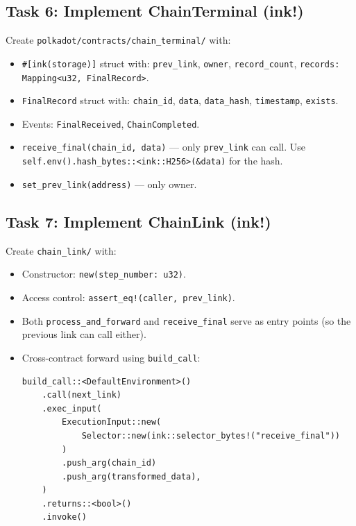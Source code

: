 \documentclass[11pt,a4paper]{article}
\begin{document}
\subsection{Task 6: Implement ChainTerminal (ink!)}

Create \texttt{polkadot/contracts/chain\_terminal/} with:

\begin{itemize}
    \item \texttt{\#[ink(storage)]} struct with: \texttt{prev\_link}, \texttt{owner},
          \texttt{record\_count}, \texttt{records: Mapping<u32, FinalRecord>}.
    \item \texttt{FinalRecord} struct with: \texttt{chain\_id}, \texttt{data},
          \texttt{data\_hash}, \texttt{timestamp}, \texttt{exists}.
    \item Events: \texttt{FinalReceived}, \texttt{ChainCompleted}.
    \item \texttt{receive\_final(chain\_id, data)} --- only \texttt{prev\_link} can call.
          Use \texttt{self.env().hash\_bytes::<ink::H256>(\&data)} for the hash.
    \item \texttt{set\_prev\_link(address)} --- only owner.
\end{itemize}

\subsection{Task 7: Implement ChainLink (ink!)}

Create \texttt{chain\_link/} with:

\begin{itemize}
    \item Constructor: \texttt{new(step\_number: u32)}.
    \item Access control: \texttt{assert\_eq!(caller, prev\_link)}.
    \item Both \texttt{process\_and\_forward} and \texttt{receive\_final} serve
          as entry points (so the previous link can call either).
    \item Cross-contract forward using \texttt{build\_call}:
\begin{lstlisting}[style=rust]
build_call::<DefaultEnvironment>()
    .call(next_link)
    .exec_input(
        ExecutionInput::new(
            Selector::new(ink::selector_bytes!("receive_final"))
        )
        .push_arg(chain_id)
        .push_arg(transformed_data),
    )
    .returns::<bool>()
    .invoke()
\end{lstlisting}
\end{itemize}
\end{document}
